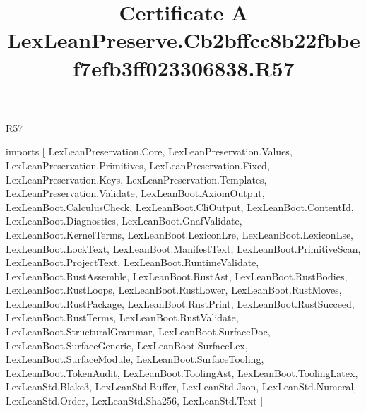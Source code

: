 \begin{lexlean}{R57}
\title{Certificate A LexLeanPreserve.Cb2bffcc8b22fbbef7efb3ff023306838.R57}
\begin{coremodule}
imports [
  LexLeanPreservation.Core,
  LexLeanPreservation.Values,
  LexLeanPreservation.Primitives,
  LexLeanPreservation.Fixed,
  LexLeanPreservation.Keys,
  LexLeanPreservation.Templates,
  LexLeanPreservation.Validate,
  LexLeanBoot.AxiomOutput,
  LexLeanBoot.CalculusCheck,
  LexLeanBoot.CliOutput,
  LexLeanBoot.ContentId,
  LexLeanBoot.Diagnostics,
  LexLeanBoot.GnafValidate,
  LexLeanBoot.KernelTerms,
  LexLeanBoot.LexiconLre,
  LexLeanBoot.LexiconLse,
  LexLeanBoot.LockText,
  LexLeanBoot.ManifestText,
  LexLeanBoot.PrimitiveScan,
  LexLeanBoot.ProjectText,
  LexLeanBoot.RuntimeValidate,
  LexLeanBoot.RustAssemble,
  LexLeanBoot.RustAst,
  LexLeanBoot.RustBodies,
  LexLeanBoot.RustLoops,
  LexLeanBoot.RustLower,
  LexLeanBoot.RustMoves,
  LexLeanBoot.RustPackage,
  LexLeanBoot.RustPrint,
  LexLeanBoot.RustSucceed,
  LexLeanBoot.RustTerms,
  LexLeanBoot.RustValidate,
  LexLeanBoot.StructuralGrammar,
  LexLeanBoot.SurfaceDoc,
  LexLeanBoot.SurfaceGeneric,
  LexLeanBoot.SurfaceLex,
  LexLeanBoot.SurfaceModule,
  LexLeanBoot.SurfaceTooling,
  LexLeanBoot.TokenAudit,
  LexLeanBoot.ToolingAst,
  LexLeanBoot.ToolingLatex,
  LexLeanStd.Blake3,
  LexLeanStd.Buffer,
  LexLeanStd.Json,
  LexLeanStd.Numeral,
  LexLeanStd.Order,
  LexLeanStd.Sha256,
  LexLeanStd.Text
]


\end{coremodule}
\end{lexlean}
